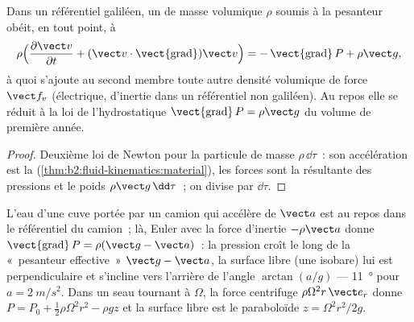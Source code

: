 \begin{theorem}\label{thm:b2:euler-bernoulli:euler}
Dans un référentiel galiléen, un  de masse volumique $\rho$ soumis à la
pesanteur obéit, en tout point, à
\[
\rho\Bigl(\frac{\partial\vect v}{\partial t} + (\vect v\cdot\operatorname{\vect{grad}})
\vect v\Bigr) = -\operatorname{\vect{grad}}P + \rho\vect g ,
\]
à quoi s'ajoute au second membre toute autre densité volumique de force $\vect f_v$ (électrique, d'inertie
dans un référentiel non galiléen). Au repos elle se réduit à
la loi de l'hydrostatique $\operatorname{\vect{grad}}P = \rho\vect g$ du
volume de première année.
\end{theorem}

\begin{proof}
Deuxième loi de Newton pour la particule de masse $\rho\,\dd\tau$~: son
accélération est la 
(\cref{thm:b2:fluid-kinematics:material}), les forces sont la résultante des
pressions et le poids $\rho\vect g\,\dd\tau$~; on divise par $\dd\tau$.
\end{proof}

\begin{example}\label{ex:b2:euler-bernoulli:tank}
L'eau d'une cuve portée par un camion qui accélère de $\vect a$ est au repos
dans le référentiel du camion~; là, Euler avec la force d'inertie $-\rho\vect a$
donne $\operatorname{\vect{grad}}P = \rho(\vect g - \vect a)$~: la pression
croît le long de la «~pesanteur effective~» $\vect g - \vect a$, la surface
libre (une isobare) lui est perpendiculaire et s'incline vers l'arrière de
l'angle $\arctan(a/g)$ --- \qty{11}{\degree} pour $a = \qty{2}{m/s^2}$. Dans un
seau tournant à $\Omega$, la force centrifuge $\rho\Omega^2r\,\vect e_r$
donne $P = P_0 + \tfrac12\rho\Omega^2r^2 - \rho gz$ et la surface libre est
le paraboloïde $z = \Omega^2r^2/2g$.
\end{example}


